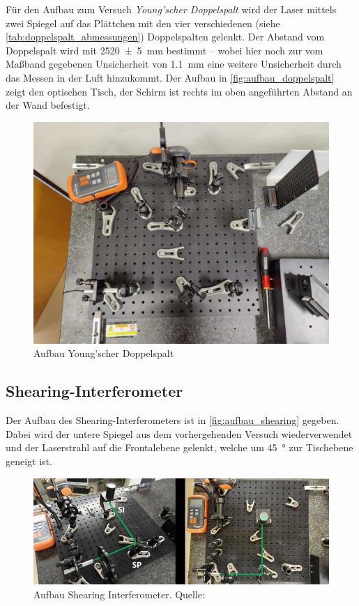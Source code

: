 \documentclass[ngerman]{scrartcl}
\begin{document}
Für den Aufbau zum Versuch \textit{Young'scher Doppelspalt} wird der Laser mittels zwei Spiegel auf das Plättchen mit den vier verschiedenen (siehe \autoref{tab:doppelspalt_abmessungen}) Doppelspalten gelenkt. Der Abstand vom Doppelspalt wird mit \SI{2520(5)}{\milli\meter} bestimmt -- wobei hier noch zur vom Maßband gegebenen Unsicherheit von \SI{1.1}{\milli\meter} eine weitere Unsicherheit durch das Messen in der Luft hinzukommt. Der Aufbau in \autoref{fig:aufbau_doppelspalt} zeigt den optischen Tisch, der Schirm ist rechts im oben angeführten Abstand an der Wand befestigt.
%
\begin{figure}[H]
    \centering
    \begin{samepage}
        \includegraphics[width=0.7\linewidth]{fig/Compressed/aufbau_doppelspalt.jpg}
        \caption{Aufbau Young'scher Doppelspalt}
        \label{fig:aufbau_doppelspalt}
    \end{samepage}
\end{figure}


\subsection{Shearing-Interferometer}
\label{sec:aufbau_shearing}

Der Aufbau des Shearing-Interferometers ist in \autoref{fig:aufbau_shearing} gegeben. Dabei wird der untere Spiegel aus dem vorhergehenden Versuch wiederverwendet und der Laserstrahl auf die Frontalebene gelenkt, welche um \SI{45}{\degree} zur Tischebene geneigt ist.
%
\begin{figure}[H]
    \centering
    \begin{samepage}
        \includegraphics[width=0.9\linewidth]{fig/Compressed/shearing.jpg}
        \caption[Aufbau Shearing Interferometer]{Aufbau Shearing Interferometer. Quelle: \cite{ref:angabe}}
        \label{fig:aufbau_shearing}
    \end{samepage}
\end{figure}
%
\end{document}
